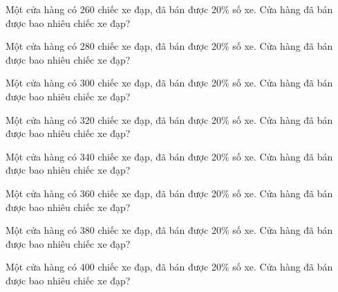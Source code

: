 \begin{ex}
  Một cửa hàng có 260 chiếc xe đạp, đã bán được 20\% số xe. Cửa hàng đã bán được bao nhiêu chiếc xe đạp?
\end{ex}

\begin{ex}
  Một cửa hàng có 280 chiếc xe đạp, đã bán được 20\% số xe. Cửa hàng đã bán được bao nhiêu chiếc xe đạp?
\end{ex}

\begin{ex}
  Một cửa hàng có 300 chiếc xe đạp, đã bán được 20\% số xe. Cửa hàng đã bán được bao nhiêu chiếc xe đạp?
\end{ex}

\begin{ex}
  Một cửa hàng có 320 chiếc xe đạp, đã bán được 20\% số xe. Cửa hàng đã bán được bao nhiêu chiếc xe đạp?
\end{ex}

\begin{ex}
  Một cửa hàng có 340 chiếc xe đạp, đã bán được 20\% số xe. Cửa hàng đã bán được bao nhiêu chiếc xe đạp?
\end{ex}

\begin{ex}
  Một cửa hàng có 360 chiếc xe đạp, đã bán được 20\% số xe. Cửa hàng đã bán được bao nhiêu chiếc xe đạp?
\end{ex}

\begin{ex}
  Một cửa hàng có 380 chiếc xe đạp, đã bán được 20\% số xe. Cửa hàng đã bán được bao nhiêu chiếc xe đạp?
\end{ex}

\begin{ex}
  Một cửa hàng có 400 chiếc xe đạp, đã bán được 20\% số xe. Cửa hàng đã bán được bao nhiêu chiếc xe đạp?
\end{ex}

